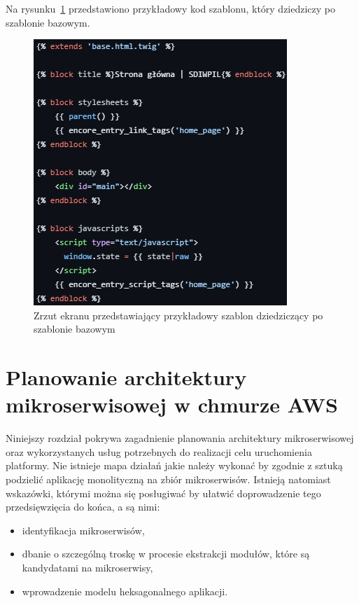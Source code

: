 \documentclass[12pt,twoside]{book}
\newcommand{\captionvspace}{\vspace{6pt}}
\begin{document}
    Na rysunku~\ref{fig:twig-inheriting-template} przedstawiono przykładowy kod szablonu, który dziedziczy po szablonie bazowym.

    \begin{figure}[ht]
        \centering
        \includegraphics[width=\textwidth]{includes/images/twig-inheriting-template.png}
        \captionvspace
        \caption{Zrzut ekranu przedstawiający przykładowy szablon dziedziczący po szablonie bazowym}
        \label{fig:twig-inheriting-template}
    \end{figure}

    \chapter{Planowanie architektury mikroserwisowej w chmurze AWS}
    Niniejszy rozdział pokrywa zagadnienie planowania architektury mikroserwisowej oraz wykorzystanych usług potrzebnych do realizacji celu uruchomienia platformy. Nie istnieje mapa działań jakie należy wykonać by zgodnie z sztuką podzielić aplikację monolityczną na zbiór mikroserwisów. Istnieją natomiast wskazówki, którymi można się posługiwać by ułatwić doprowadzenie tego przedsięwzięcia do końca, a są nimi:

    \begin{itemize}
        \item identyfikacja mikroserwisów,
        \item dbanie o szczególną troskę w procesie ekstrakcji modułów, które są kandydatami na mikroserwisy,
        \item wprowadzenie modelu heksagonalnego aplikacji. \cite{java.ee.8.design.patterns}
    \end{itemize}
\end{document}
